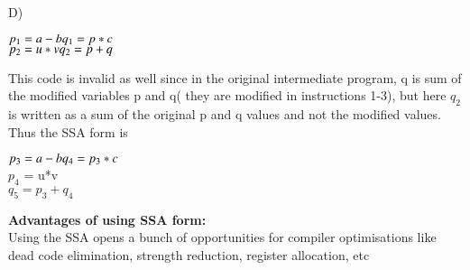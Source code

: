 \documentclass[journal,12pt,twocolumn]{IEEEtran}
\begin{document}
D)
\begin{tcolorbox}
$p_{1}  = a - b \\
q_{1}  = p*c$ \\
$p_{2}  = u*v  \\
q_{2}  = p + q$ \\
\end{tcolorbox}
This code is invalid as well since in the original intermediate program, q is sum of the modified variables p and q( they are modified in instructions 1-3), but here $q_2$ is written as a sum of the original p and q values and not the modified values. \\
Thus the SSA form is 
\begin{tcolorbox}[colback=gray!50!white]
$p_{3}  = a - b \\
q_{4}  = p_3*c$ \\
$p_{4}$  = u*v \\ 
$q_{5}  = p_{3} + q_{4}$
\end{tcolorbox}

\textbf{Advantages of using SSA form:} \\
Using the SSA opens a bunch of opportunities for compiler optimisations like dead code elimination, strength reduction, register allocation, etc 
\end{document}
